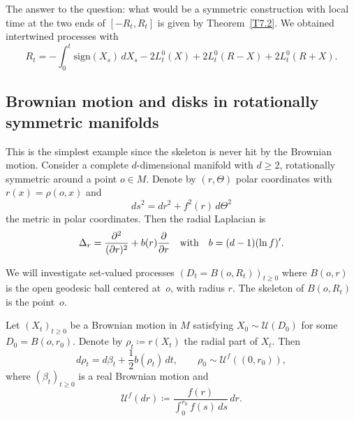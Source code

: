 \documentclass[JEP,XML,SOM,Unicode,NoFloatCountersInSection,published]{cedram}
\theoremstyle{plain}
\theoremstyle{definition}
\newcommand{\SU}{{\mathscr U}}
\newcommand\df{\coloneqq}
\newcommand{\sign}{\mathrm{sign}}
\let\f\frac
\let\b\beta
\begin{document}
The answer to the question: what would be a symmetric construction with local time at the two ends of $[-R_t,R_t]$ is given by Theorem~\ref{T7.2}. We obtained intertwined processes with
\begin{equation}
R_t=-\int_0^t\sign(X_s)\,dX_s-2L_t^0(X)+2L_t^0(R-X)+2L_t^0(R+X).
\end{equation}

\subsection{Brownian motion and disks in rotationally symmetric manifolds}
\label{Subsection5.2}
This is the simplest example since the skeleton is never hit by the Brownian motion. Consider a complete $d$-dimensional manifold with $d\ge 2$, rotationally symmetric around a point $o\in M$. Denote by $(r,\Theta)$ polar coordinates with $r(x)=\rho(o,x)$ and
\begin{equation}
ds^2=dr^2+f^2(r)\,d\Theta^2
\end{equation}
the metric in polar coordinates. Then the radial Laplacian is
\begin{equation}
\Delta_r=\f{\partial^2}{(\partial r)^2} +b(r)\f{\partial}{\partial r}\quad\hbox{with}\quad b=(d-1)(\ln f)'.
\end{equation}

We will investigate set-valued processes $(D_t=B(o,R_t))_{t\ge0}$ where $B(o,r)$ is the open geodesic ball centered at~$o$, with radius $r$. The skeleton of $B(o,R_t)$ is the point~$o$.

Let $(X_t)_{t\ge0}$ be a Brownian motion in $M$ satisfying $X_0\sim \SU(D_0)$ for some $D_0=B(o,r_0)$. Denote by $\rho_t\df r(X_t)$ the radial part of $X_t$. Then
\begin{equation}
d\rho_t=d\b_t+\f12 b(\rho_t)\,dt, \qquad \rho_0\sim \SU^f((0,r_0)),
\end{equation}
where $(\b_t)_{t\geq 0}$ is a real Brownian motion and
\begin{equation}
\SU^f(dr)\df \f{f(r)}{\int_0^{r_0}f(s)\,ds}\,dr.
\end{equation}
\end{document}
